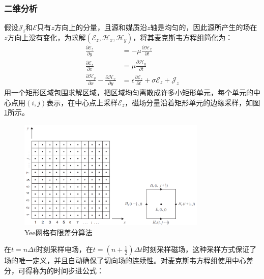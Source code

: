 \documentclass{article}
\numberwithin{equation}{section}
\renewcommand{\vec}[1]{\boldsymbol{#1}}
\begin{document}
\subsubsection{二维分析}
假设$\vec{\mathcal{J}}_{i}$和$\vec{\mathcal{E}}$只有$z$方向上的分量，且源和媒质沿$z$轴是均匀的，因此源所产生的场在$z$方向上没有变化，为求解$(\mathcal{E}_z,\mathcal{H}_x,\mathcal{H}_y)$，将其麦克斯韦方程组简化为：
\begin{align}
    \label{eq:eq563}
    \frac{\partial\mathcal{E}_z}{\partial y}&=-\mu\frac{\partial\mathcal{H}_x}{\partial t} \\
    \label{eq:eq564}
    \frac{\partial\mathcal{E}_z}{\partial x}&=\mu\frac{\partial\mathcal{H}_y}{\partial t} \\
    \label{eq:eq565}
    \frac{\partial\mathcal{H}_y}{\partial x}-\frac{\partial\mathcal{H}_x}{\partial y}&=\epsilon\frac{\partial\mathcal{E}_z}{\partial t}+\sigma\mathcal{E}_z+\mathcal{J}_z
\end{align}
用一个矩形区域包围求解区域，把区域均匀离散成许多小矩形单元，每个单元的中心点用$(i,j)$表示，在中心点上采样$\mathcal{E}_z$，磁场分量沿着矩形单元的边缘采样，如图\ref{fig:fig49}所示。
\begin{figure}[ht]
    \centering
    \includegraphics[width=0.8\textwidth]{Yee网格有限差分算法.PNG}
    \caption{Yee网格有限差分算法}
    \label{fig:fig49}
\end{figure}
\par
在$t=n\Delta t$时刻采样电场，在$t=(n+\frac{1}{2})\Delta t$时刻采样磁场，这种采样方式保证了场的唯一定义，并且自动确保了切向场的连续性。对麦克斯韦方程组使用中心差分，可得称为\textbf{\color{blue}{蛙跳时间积分}}的时间步进公式：
\end{document}
